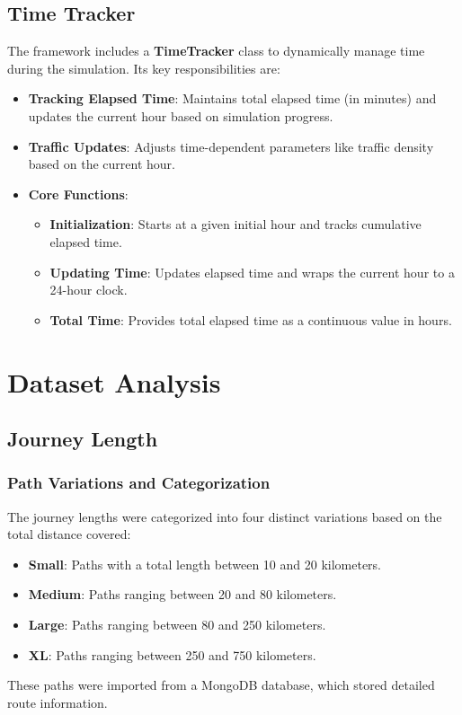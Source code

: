 \documentclass[sigplan,screen]{acmart}
\begin{document}
\subsection{Time Tracker}
The framework includes a \textbf{TimeTracker} class to dynamically manage time during the simulation. Its key responsibilities are:

\begin{itemize}
    \item \textbf{Tracking Elapsed Time}: Maintains total elapsed time (in minutes) and updates the current hour based on simulation progress.
    \item \textbf{Traffic Updates}: Adjusts time-dependent parameters like traffic density based on the current hour.
    \item \textbf{Core Functions}:
    \begin{itemize}
        \item \textbf{Initialization}: Starts at a given initial hour and tracks cumulative elapsed time.
        \item \textbf{Updating Time}: Updates elapsed time and wraps the current hour to a 24-hour clock.
        \item \textbf{Total Time}: Provides total elapsed time as a continuous value in hours.
    \end{itemize}
\end{itemize}


\section{Dataset Analysis}

\subsection{Journey Length}
\subsubsection{Path Variations and Categorization}
The journey lengths were categorized into four distinct variations based on the total distance covered:
\begin{itemize}
    \item \textbf{Small}: Paths with a total length between 10 and 20 kilometers.
    \item \textbf{Medium}: Paths ranging between 20 and 80 kilometers.
    \item \textbf{Large}: Paths ranging between 80 and 250 kilometers.
    \item \textbf{XL}: Paths ranging between 250 and 750 kilometers.
\end{itemize}
These paths were imported from a MongoDB database, which stored detailed route information.
\end{document}
